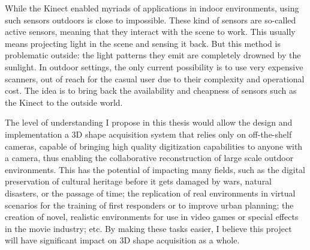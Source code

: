 While the Kinect enabled myriads of applications in indoor environments, using such sensors outdoors is close to impossible. These kind of sensors are so-called active sensors, meaning that they interact with the scene to work. This usually means projecting light in the scene and sensing it back. But this method is problematic outside: the light patterns they emit are completely drowned by the sunlight. In outdoor settings, the only current possibility is to use very expensive scanners, out of reach for the casual user due to their complexity and operational cost. The idea is to bring back the availability and cheapness of sensors such as the Kinect to the outside world.

The level of understanding I propose in this thesis would allow the design and implementation a 3D shape acquisition system that relies only on off-the-shelf cameras, capable of bringing high quality digitization capabilities to anyone with a camera, thus enabling the collaborative reconstruction of large scale outdoor environments. This has the potential of impacting many fields, such as the digital preservation of cultural heritage before it gets damaged by wars, natural disasters, or the passage of time; the replication of real environments in virtual scenarios for the training of first responders or to improve urban planning; the creation of novel, realistic environments for use in video games or special effects in the movie industry; etc. By making these tasks easier, I believe this project will have significant impact on 3D shape acquisition as a whole.